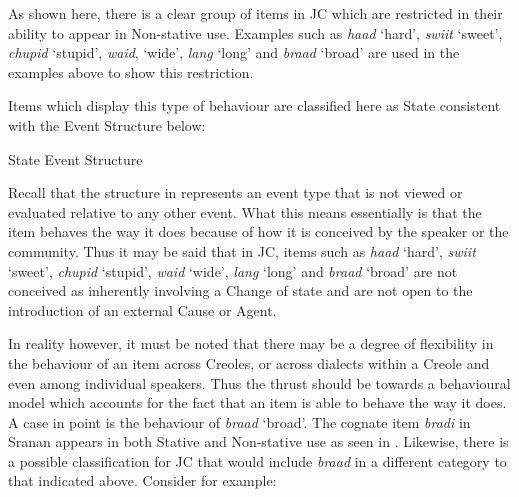 
\z
 \z

As shown here, there is a clear group of items in JC which are restricted in their ability to appear in Non-stative use. Examples such as \textit{haad} `hard', \textit{swiit} `sweet', \textit{chupid} `stupid', \textit{waid}, `wide', \textit{lang} `long' and \textit{braad} `broad' are used in the examples above to show this restriction.

Items which display this type of behaviour are classified here as State consistent with the Event Structure below: 

\ea%
\label{ex:5:18}
State Event Structure \citep[56]{Pustejovsky1991}
\begin{center}
\fbox{\parbox{3cm}{\centering
\begin{forest} [S [e]] \end{forest}}}
\end{center}
\z  
 
Recall that the structure in  represents an event type that is not viewed or evaluated relative to any other event. What this means essentially is that the item behaves the way it does because of how it is conceived by the speaker or the community. Thus it may be said that in JC, items such as \textit{haad} `hard', \textit{swiit} `sweet', \textit{chupid} `stupid', \textit{waid}  `wide’, \textit{lang} `long' and \textit{braad} `broad' are not conceived as inherently involving a Change of state and are not open to the introduction of an external Cause or Agent. 

In reality however, it must be noted that there may be a degree of flexibility in the behaviour of an item across Creoles, or across dialects within a Creole and even among individual speakers. Thus the thrust should be towards a behavioural model which accounts for the fact that an item is able to behave the way it does. A case in point is the behaviour of \textit{braad} ‘broad’. The cognate item \textit{bradi} in Sranan appears in both Stative and Non-stative use as seen in . Likewise, there is a possible classification for JC that would include \textit{braad} in a different category to that indicated above. Consider  for example:


